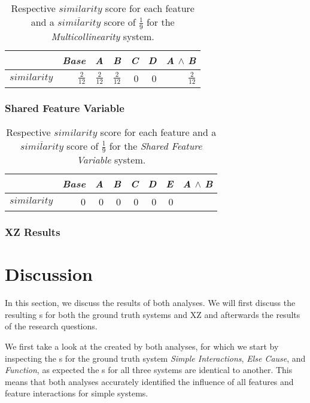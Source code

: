 \begin{table}[H]
    \centering
    \begin{tabular}{lrrrrrr}    \toprule
               & \emph{Base} & \emph{A} & \emph{B} & \emph{C} & \emph{D} & \emph{A} $\land$ \emph{B}   \\ \midrule
    $similarity$ & $\frac{2}{12}$ & $ \frac{2}{12}$ &  $\frac{2}{12}$ & 0 & 0 &  $\frac{2}{12}$      \\ \bottomrule
    \end{tabular}
    \caption{Respective $similarity$ score for each feature and a $\overline{similarity}$ score of $\frac{1}{9}$ for the \emph{Multicollinearity} system.}
\end{table}

\subsubsection*{Shared Feature Variable} %

\begin{table}[H]
    \centering
    \begin{tabular}{lrrrrrrr}    \toprule
               & \emph{Base} & \emph{A} & \emph{B} & \emph{C} & \emph{D} & \emph{E} & \emph{A} $\land$ \emph{B}   \\ \midrule
    $similarity$ & 0 & 0 & 0 & 0 & 0 & 0      \\ \bottomrule
    \end{tabular}
    \caption{Respective $similarity$ score for each feature and a $\overline{similarity}$ score of $\frac{1}{9}$ for the \emph{Shared Feature Variable} system.}
\end{table}

\subsubsection*{XZ Results}

\section{Discussion}\label{sec:discussion}

In this section, we discuss the results of both analyses. We will first discuss the resulting {\perfInfluenceModel}s 
for both the ground truth systems and \textsc{XZ} and afterwards the results of the research questions.

We first take a look at the {\perfInfluenceModel} created by both analyses, 
for which we start by inspecting the {\perfInfluenceModel}s for the ground truth system \emph{Simple Interactions}, 
\emph{Else Cause}, and \emph{Function}, as expected the {\perfInfluenceModel}s for all three systems are identical to another. 
This means that both analyses accurately identified the influence of all features and feature interactions for simple systems.

